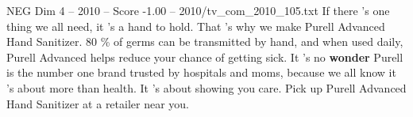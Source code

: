 \begin{textsample}{NEG Dim 4 – 2010 – Score -1.00 – 2010/tv\_com\_2010\_105.txt}  \label{ex:f4_neg_044}
If there 's one thing we all need, it 's a hand to hold.
That 's why we make Purell Advanced Hand Sanitizer. 80 \% of germs can be transmitted by hand, and when used daily, Purell Advanced helps reduce your chance of getting sick.
It 's no \textbf{wonder} Purell is the number one brand trusted by hospitals and moms, because we all know it 's about more than health.
It 's about showing you care.
Pick up Purell Advanced Hand Sanitizer at a retailer near you.

\end{textsample}
